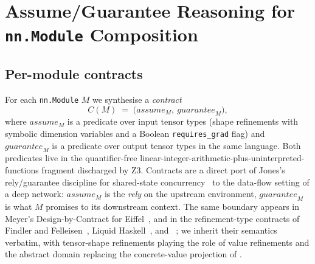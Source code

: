 
\section{Assume/Guarantee Reasoning for \texttt{nn.Module} Composition}
\label{sec:assume-guarantee}

\subsection{Per-module contracts}
\label{sec:ag:contracts}

For each \texttt{nn.Module} $M$ we synthesise a \emph{contract}
\[
 C(M) \;=\; \bigl(\mathit{assume}_M,\ \mathit{guarantee}_M\bigr),
\]
where $\mathit{assume}_M$ is a predicate over input tensor types
(shape refinements with symbolic dimension variables and a Boolean
\texttt{requires\_grad} flag) and $\mathit{guarantee}_M$ is a predicate
over output tensor types in the same language. Both predicates live in
the quantifier-free linear-integer-arithmetic-plus-uninterpreted-functions
fragment discharged by Z3. Contracts are a direct port of Jones's
rely/guarantee discipline for shared-state concurrency~\citep{jones1983tentative}
to the data-flow setting of a deep network: $\mathit{assume}_M$ is the
\emph{rely} on the upstream environment, $\mathit{guarantee}_M$ is what
$M$ promises to its downstream context. The same boundary appears in
Meyer's Design-by-Contract for Eiffel~\citep{meyer1992applying}, and in
the refinement-type contracts of Findler and
Felleisen~\citep{findler2002contracts}, Liquid Haskell~\citep{vazou2014refinement},
and \fstar~\citep{swamy2016dependent}; we inherit their semantics
verbatim, with tensor-shape refinements playing the role of value
refinements and the abstract domain replacing the concrete-value
projection of \citet{cousot1977abstract}.

